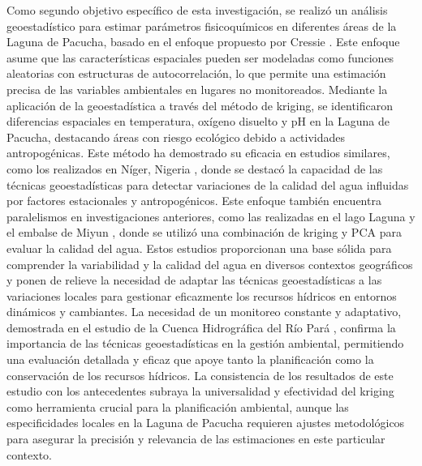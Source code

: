 Como segundo objetivo específico de esta investigación, se realizó un análisis geoestadístico para estimar parámetros fisicoquímicos en diferentes áreas de la Laguna de Pacucha, basado en el enfoque propuesto por Cressie \cite{Cressie1993}. Este enfoque asume que las características espaciales pueden ser modeladas como funciones aleatorias con estructuras de autocorrelación, lo que permite una estimación precisa de las variables ambientales en lugares no monitoreados. Mediante la aplicación de la geoestadística a través del método de kriging, se identificaron diferencias espaciales en temperatura, oxígeno disuelto y pH en la Laguna de Pacucha, destacando áreas con riesgo ecológico debido a actividades antropogénicas. Este método ha demostrado su eficacia en estudios similares, como los realizados en Níger, Nigeria \cite{Audu2015}, donde se destacó la capacidad de las técnicas geoestadísticas para detectar variaciones de la calidad del agua influidas por factores estacionales y antropogénicos. Este enfoque también encuentra paralelismos en investigaciones anteriores, como las realizadas en el lago Laguna y el embalse de Miyun \cite{Zhengjun2010}, donde se utilizó una combinación de kriging y PCA para evaluar la calidad del agua. Estos estudios proporcionan una base sólida para comprender la variabilidad y la calidad del agua en diversos contextos geográficos y ponen de relieve la necesidad de adaptar las técnicas geoestadísticas a las variaciones locales para gestionar eficazmente los recursos hídricos en entornos dinámicos y cambiantes. La necesidad de un monitoreo constante y adaptativo, demostrada en el estudio de la Cuenca Hidrográfica del Río Pará \cite{sousa}, confirma la importancia de las técnicas geoestadísticas en la gestión ambiental, permitiendo una evaluación detallada y eficaz que apoye tanto la planificación como la conservación de los recursos hídricos. La consistencia de los resultados de este estudio con los antecedentes subraya la universalidad y efectividad del kriging como herramienta crucial para la planificación ambiental, aunque las especificidades locales en la Laguna de Pacucha requieren ajustes metodológicos para asegurar la precisión y relevancia de las estimaciones en este particular contexto.

